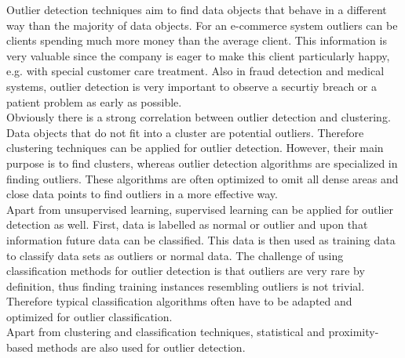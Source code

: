 Outlier detection techniques aim to find data objects that behave in a different way than the majority of data objects. For an e-commerce system outliers can be clients spending much more money than the average client. This information is very valuable since the company is eager to make this client particularly happy, e.g. with special customer care treatment. Also in fraud detection and medical systems, outlier detection is very important to observe a securtiy breach or a patient problem as early as possible.
\\
Obviously there is a strong correlation between outlier detection and clustering. Data objects that do not fit into a cluster are potential outliers. Therefore clustering techniques can be applied for outlier detection. However, their main purpose is to find clusters, whereas outlier detection algorithms are specialized in finding outliers. These algorithms are often optimized to omit all dense areas and close data points to find outliers in a more effective way.
\\
Apart from unsupervised learning, supervised learning can be applied for outlier detection as well. First, data is labelled as normal or outlier and upon that information future data can be classified. This data is then used as training data to classify data sets as outliers or normal data. The challenge of using classification methods for outlier detection is that outliers are very rare by definition, thus finding training instances resembling outliers is not trivial. Therefore typical classification algorithms often have to be adapted and optimized for outlier classification.
\\
Apart from clustering and classification techniques, statistical and proximity-based methods are also used for outlier detection.



